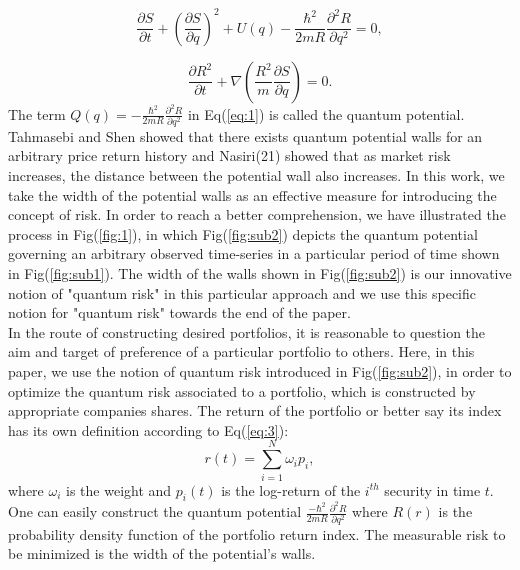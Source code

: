\documentclass[ aip,jmp,reprint]{revtex4-2}
\begin{document}
\begin{equation}
\frac{\partial S}{\partial t}+(\frac{\partial S}{\partial q}%
)^{2}+U(q)-\frac{\hbar ^{2}}{2mR}\frac{\partial ^{2}R}{\partial q^2}=0,  \label{eq:1}
\end{equation}%

\begin{equation}
\frac{\partial R^{2}}{\partial t}+\nabla (\frac{R^{2}}{m}\frac{\partial S}{\partial q})=0.  \label{eq:2}
\end{equation}%
\newline
The term $Q(q)=-\frac{\hbar^2}{2mR}\frac{\partial ^{2}R}{\partial q^2}$ in Eq(\ref{eq:1}) is called the quantum potential. 
Tahmasebi\cite{Tahmasebi} and Shen\cite{Shen} showed that  there exists quantum potential walls for an arbitrary price return history and Nasiri(21) showed that as market risk increases, the distance between the potential wall also increases.  
In this work, we take the width of the potential walls as an effective measure for introducing the concept of risk. In order to reach a better comprehension, we have illustrated the process in Fig(\ref{fig:1}), in which Fig(\ref{fig:sub2}) depicts the quantum potential governing an arbitrary observed time-series in a particular period of time shown in Fig(\ref{fig:sub1}). The width of the walls shown in Fig(\ref{fig:sub2}) is our innovative notion of "quantum risk" in this particular approach and we use this specific notion for "quantum risk" towards the end of the paper.\\
In the route of constructing desired portfolios, it is reasonable to question the aim and target of preference of a particular portfolio to others.  Here, in this paper, we use the notion of quantum risk introduced in Fig(\ref{fig:sub2}), in order to optimize the quantum risk associated to a portfolio, which is constructed by appropriate companies shares. The return of the portfolio or better say its index has its own definition according to Eq(\ref{eq:3}):
\newline
\begin{equation}
r(t) = \sum_{i=1}^{N}\omega_{i}p_i, \label{eq:3}
\end{equation}
\newline
where $\omega_{i}$ is the weight and $p_i(t)$ is the log-return of the $i^{th}$ 
security in time $t$. One can easily construct the quantum potential $\frac{-\hbar^2}{2mR}\frac{\partial ^{2}R}{\partial q^2}$ 
where $R(r)$ is the probability density function of the portfolio return index. The measurable risk to 
be minimized is the width of the  potential's walls.
\end{document}

